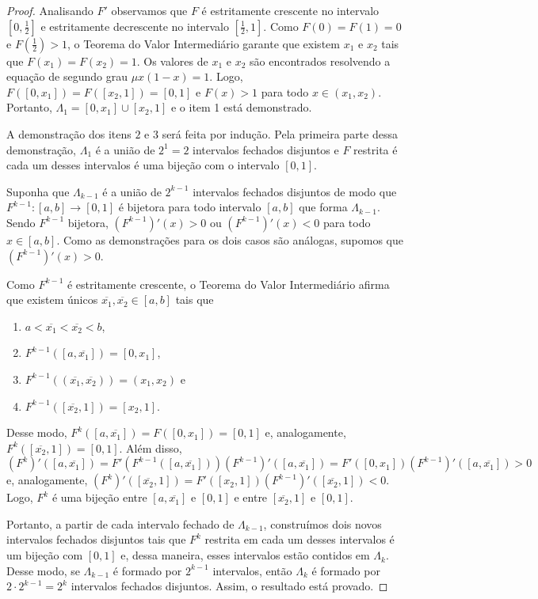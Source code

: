 \documentclass[a4paper, 12pt]{article}
\theoremstyle{definition}
\theoremstyle{plain}
\theoremstyle{plain}
\theoremstyle{plain}
\theoremstyle{remark}
\begin{document}
\begin{proof}
Analisando $F'$ observamos que $F$ é estritamente crescente no intervalo $[0, \frac{1}{2}]$ e estritamente decrescente no intervalo $[\frac{1}{2}, 1]$. Como $F(0) = F(1) = 0$ e $F(\frac{1}{2}) > 1$, o Teorema do Valor Intermediário garante que existem $x_1$ e $x_2$ tais que $F(x_1) = F(x_2) = 1$. Os valores de $x_1$ e $x_2$ são encontrados resolvendo a equação de segundo grau $\mu x(1-x) = 1$. Logo, $F([0, x_1]) = F([x_2, 1]) = [0, 1]$ e $F(x) > 1$ para todo $x \in (x_1, x_2)$. Portanto, $\Lambda_1 = [0, x_1] \cup [x_2, 1]$ e o item 1 está demonstrado.

A demonstração dos itens $2$ e $3$ será feita por indução. Pela primeira parte dessa demonstração, $\Lambda_1$ é a união de $2^1 = 2$ intervalos fechados disjuntos e $F$ restrita é cada um desses intervalos é uma bijeção com o intervalo $[0,1]$.

Suponha que $\Lambda_{k-1}$ é a união de $2^{k-1}$ intervalos fechados disjuntos de modo que $F^{k-1}: [a, b] \rightarrow [0, 1]$ é bijetora para todo intervalo $[a, b]$ que forma $\Lambda_{k-1}$. Sendo $F^{k-1}$ bijetora, $(F^{k-1})'(x) > 0$ ou $(F^{k-1})'(x) < 0$ para todo $x \in [a, b]$. Como as demonstrações para os dois casos são análogas, supomos que $(F^{k-1})'(x) > 0$.

Como $F^{k-1}$ é estritamente crescente, o Teorema do Valor Intermediário afirma que existem únicos $\overline{x_1}, \overline{x_2} \in [a, b]$ tais que
\begin{enumerate}[label=(\alph*)]
\item$a < \overline{x_1} < \overline{x_2} < b$,
\item$F^{k-1}([a, \overline{x_1}]) = [0, x_1]$,
\item$F^{k-1}((\overline{x_1}, \overline{x_2})) = (x_1, x_2)$ e
\item$F^{k-1}([\overline{x_2}, 1]) = [x_2, 1]$.
\end{enumerate}

Desse modo, $F^k([a, \overline{x_1}]) = F([0, x_1]) = [0, 1]$ e, analogamente, $F^k([\overline{x_2}, 1]) = [0, 1]$. Além disso, $(F^k)'([a, \overline{x_1}]) = F'(F^{k-1}([a, \overline{x_1}]))(F^{k-1})'([a, \overline{x_1}]) = F'([0, x_1])(F^{k-1})'([a, \overline{x_1}]) > 0$ e, analogamente, $(F^k)'([\overline{x_2}, 1]) = F'([x_2, 1])(F^{k-1})'([\overline{x_2}, 1]) < 0$. Logo, $F^k$ é uma bijeção entre $[a, \overline{x_1}]$ e $[0, 1]$ e entre $[\overline{x_2}, 1]$ e $[0, 1]$.

Portanto, a partir de cada intervalo fechado de $\Lambda_{k-1}$, construímos dois novos intervalos fechados disjuntos tais que $F^k$ restrita em cada um desses intervalos é um bijeção com $[0, 1]$ e, dessa maneira, esses intervalos estão contidos em $\Lambda_k$. Desse modo, se $\Lambda_{k-1}$ é formado por $2^{k-1}$ intervalos, então $\Lambda_k$ é formado por $2 \cdot 2^{k-1} = 2^k$ intervalos fechados disjuntos. Assim, o resultado está provado.
\end{proof}
\end{document}
